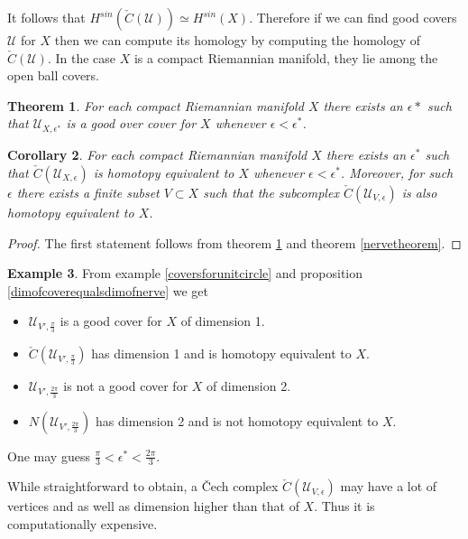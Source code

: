 \documentclass[12pt]{amsart}
\newtheorem{theorem}{Theorem}[section]
\newtheorem{corollary}[theorem]{Corollary}
\theoremstyle{definition}
\newtheorem{example}[theorem]{Example}
\begin{document}
It follows that $H^{sin}(\check{C}(\mathcal{U})) \simeq H^{sin}(X)$. Therefore if we can find good covers $\mathcal{U}$ for $X$ then we can compute its homology by computing the homology of $\check{C}(\mathcal{U})$. In the case $X$ is a compact Riemannian manifold, they lie among the open ball covers.

\begin{theorem}\label{openballcovergood} For each compact Riemannian manifold $X$ there exists an $\epsilon*$ such that $\mathcal{U}_{X, \epsilon^*}$ is a good over cover for $X$ whenever $\epsilon < \epsilon^*$.
\end{theorem}

\begin{corollary}\label{CechcomplexhomotopyequivalenttoX} For each compact Riemannian manifold $X$ there exists an $\epsilon^*$ such that $\check{C}(\mathcal{U}_{X, \epsilon})$ is homotopy equivalent to $X$ whenever $\epsilon < \epsilon^*$. Moreover, for such $\epsilon$ there exists a finite subset $V \subset X$ such that the subcomplex $\check{C}(\mathcal{U}_{V, \epsilon})$ is also homotopy equivalent to $X$.
\end{corollary}
\begin{proof} The first statement follows from theorem \ref{openballcovergood} and theorem \ref{nervetheorem}.
\end{proof}

\begin{example} From example \ref{coversforunitcircle} and proposition \ref{dimofcoverequalsdimofnerve} we get
\begin{itemize}
\item $\mathcal{U}_{V', \frac{\pi}{3}}$ is a good cover for $X$ of dimension 1.
\item $\check{C}(\mathcal{U}_{V', \frac{\pi}{3}})$ has dimension 1 and is homotopy equivalent to $X$.
\item $\mathcal{U}_{V', \frac{2\pi}{3}}$ is not a good cover for $X$ of dimension 2.
\item $N(\mathcal{U}_{V', \frac{2\pi}{3}})$ has dimension 2 and is not homotopy equivalent to $X$.
\end{itemize}

One may guess $\frac{\pi}{3} < \epsilon^* < \frac{2\pi}{3}$.
\end{example}

While straightforward to obtain, a \v{C}ech complex $\check{C}(\mathcal{U}_{V, \epsilon})$ may have a lot of vertices and as well as dimension higher than that of $X$. Thus it is computationally expensive.
\end{document}
